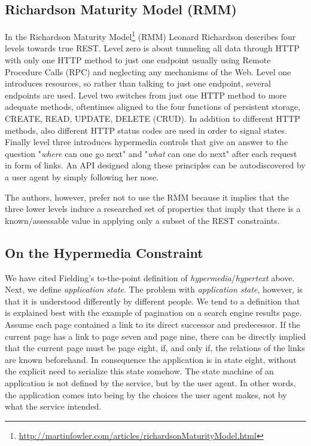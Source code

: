 \documentclass{acm_proc_article-sp}
\begin{document}
\subsection{Richardson Maturity Model (RMM)}\label{sec:rmm}
In the Richardson Maturity Model\footnote{\url{http://martinfowler.com/articles/richardsonMaturityModel.html}} (RMM) Leonard Richardson describes four levels towards true REST. Level zero is about tunneling all data through HTTP with only one HTTP method to just one endpoint usually using Remote Procedure Calls (RPC) and neglecting any mechanisms of the Web. Level one introduces resources, so rather than talking to just one endpoint, several endpoints are used. Level two switches from just one HTTP method to more adequate methods, oftentimes aligned to the four functions of persistent storage, CREATE, READ, UPDATE, DELETE (CRUD). In addition to different HTTP methods, also different HTTP status codes are used in order to signal states. Finally level three introduces hypermedia controls that give an answer to the question "\textit{where} can one go next" and "\textit{what} can one do next" after each request in form of links. An API designed along these principles can be autodiscovered by a user agent by simply following her nose.

The authors, however, prefer not to use the RMM because it implies that the three lower levels induce a researched set of properties that imply that there is a known/assessable value in applying only a subset of the REST constraints.

\subsection{On the Hypermedia Constraint}\label{sec:hateoas}
We have cited Fielding's to-the-point definition of \textit{hypermedia}/\textit{hypertext} above. Next, we define \textit{application state}. The problem with \textit{application state}, however, is that it is understood differently by different people. We tend to a definition that is explained best with the example of pagination on a search engine results page. Assume each page contained a link to its direct successor and predecessor. If the current page has a link to page seven and page nine, there can be directly implied that the current page must be page eight, if, and only if, the relations of the links are known beforehand. In consequence the application is in state eight, without the explicit need to serialize this state somehow. The state machine of an application is not defined by the service, but by the user agent. In other words, the application comes into being by the choices the user agent makes, not by what the service intended.
\end{document}
